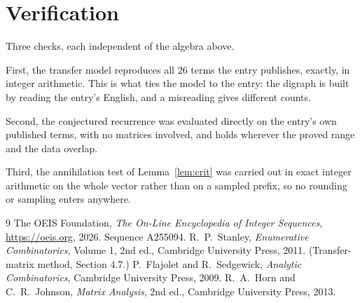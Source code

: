 \documentclass[11pt,a4paper]{article}
\theoremstyle{plain}
\theoremstyle{definition}
\begin{document}
\section{Verification}

Three checks, each independent of the algebra above.

First, the transfer model reproduces all $26$ terms the entry publishes, exactly, in
integer arithmetic. This is what ties the model to the entry: the digraph is built by reading
the entry's English, and a misreading gives different counts.

Second, the conjectured recurrence was evaluated directly on the entry's own published terms,
with no matrices involved, and holds wherever the proved range and the data overlap.

Third, the annihilation test of Lemma~\ref{lem:crit} was carried out in exact integer
arithmetic on the whole vector rather than on a sampled prefix, so no rounding or sampling
enters anywhere.

\begin{thebibliography}{9}
 The OEIS Foundation, \emph{The On-Line Encyclopedia of Integer
Sequences}, \url{https://oeis.org}, 2026. Sequence A255094.
 R.~P.~Stanley, \emph{Enumerative Combinatorics}, Volume 1, 2nd ed.,
Cambridge University Press, 2011. (Transfer-matrix method, Section 4.7.)
 P.~Flajolet and R.~Sedgewick, \emph{Analytic Combinatorics}, Cambridge
University Press, 2009.
 R.~A.~Horn and C.~R.~Johnson, \emph{Matrix Analysis}, 2nd ed., Cambridge
University Press, 2013.
\end{thebibliography}
\end{document}
